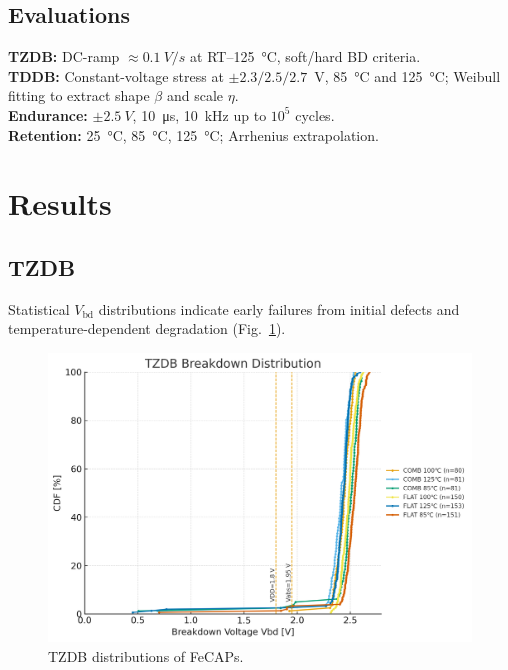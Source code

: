 \documentclass[conference]{IEEEtran}
\begin{document}
\subsection{Evaluations}
\textbf{TZDB:} DC-ramp \(\approx\SI{0.1}{V/s}\) at RT--\SI{125}{\celsius}, soft/hard BD criteria.\\
\textbf{TDDB:} Constant-voltage stress at \(\pm 2.3/2.5/2.7\)~V, \SI{85}{\celsius} and \SI{125}{\celsius}; Weibull fitting to extract shape \(\beta\) and scale \(\eta\).\\
\textbf{Endurance:} \(\pm\SI{2.5}{V}\), \SI{10}{\micro s}, \SI{10}{kHz} up to \(10^{5}\) cycles.\\
\textbf{Retention:} \SI{25}{\celsius}, \SI{85}{\celsius}, \SI{125}{\celsius}; Arrhenius extrapolation.

\section{Results}
\subsection{TZDB}
Statistical \(V_{\mathrm{bd}}\) distributions indicate early failures from initial defects and temperature-dependent degradation (Fig.~\ref{fig:tzdb}).
\begin{figure}[t]\centering
  \includegraphics[width=\linewidth]{fig3_tzdb.png}
  \caption{TZDB distributions of FeCAPs.}
  \label{fig:tzdb}
\end{figure}
\end{document}
